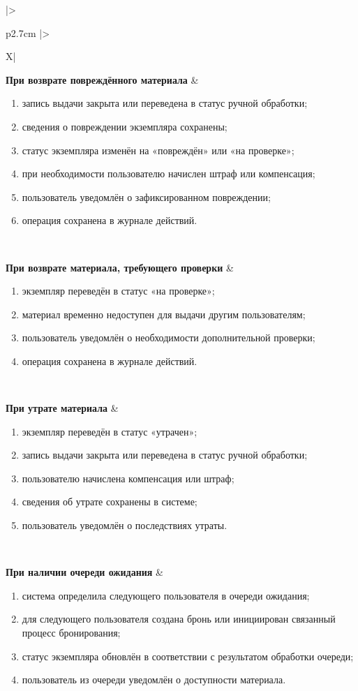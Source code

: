 \documentclass[12pt,a4paper]{article}
\begin{document}
\begin{xltabular}{\textwidth}{
				|>{\raggedright\arraybackslash}p{2.7cm}
				|>{\raggedright\arraybackslash}X|
			}
			\textbf{При возврате повреждённого материала} &
			\begin{enumerate}
				\item запись выдачи закрыта или переведена в статус ручной обработки;
				\item сведения о повреждении экземпляра сохранены;
				\item статус экземпляра изменён на «повреждён» или «на проверке»;
				\item при необходимости пользователю начислен штраф или компенсация;
				\item пользователь уведомлён о зафиксированном повреждении;
				\item операция сохранена в журнале действий.
			\end{enumerate} \\
			\hline
			
			\textbf{При возврате материала, требующего проверки} &
			\begin{enumerate}
				\item экземпляр переведён в статус «на проверке»;
				\item материал временно недоступен для выдачи другим пользователям;
				\item пользователь уведомлён о необходимости дополнительной проверки;
				\item операция сохранена в журнале действий.
			\end{enumerate} \\
			\hline
			
			\textbf{При утрате материала} &
			\begin{enumerate}
				\item экземпляр переведён в статус «утрачен»;
				\item запись выдачи закрыта или переведена в статус ручной обработки;
				\item пользователю начислена компенсация или штраф;
				\item сведения об утрате сохранены в системе;
				\item пользователь уведомлён о последствиях утраты.
			\end{enumerate} \\
			\hline
			
			\textbf{При наличии очереди ожидания} &
			\begin{enumerate}
				\item система определила следующего пользователя в очереди ожидания;
				\item для следующего пользователя создана бронь или инициирован
				связанный процесс бронирования;
				\item статус экземпляра обновлён в соответствии с результатом обработки
				очереди;
				\item пользователь из очереди уведомлён о доступности материала.
			\end{enumerate} \\
			\hline
			

\end{xltabular}
\end{document}
